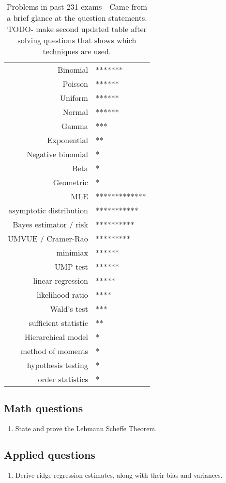 \documentclass[10pt, twocolumn]{article}
\begin{document}
\begin{table}[]
    \centering
    \caption{Problems in past 231 exams - Came from a brief glance at the
    question statements. TODO- make second updated table after solving
    questions that shows which techniques are used.}
    \label{231problems}
    \begin{tabular}{rl}

        Binomial                & ******* \\
        Poisson                 & ****** \\
        Uniform                 & ****** \\
        Normal                  & ****** \\
        Gamma                   & *** \\
        Exponential             & ** \\
        Negative binomial       & * \\
        Beta                    & * \\
        Geometric               & * \\
        MLE                     & ************* \\
        asymptotic distribution & *********** \\
        Bayes estimator / risk  & ********** \\
        UMVUE / Cramer-Rao      & ********* \\
        minimiax                & ****** \\
        UMP test                & ****** \\
        linear regression       & ***** \\
        likelihood ratio        & **** \\
        Wald's test             & *** \\
        sufficient statistic    & ** \\
        Hierarchical model      & * \\
        method of moments       & * \\
        hypothesis testing      & * \\
        order statistics        & * \\

    \end{tabular}
\end{table}

\subsection{Math questions}

\begin{enumerate}
    \item State and prove the Lehmann Scheffe Theorem.
\end{enumerate}

\subsection{Applied questions}

\begin{enumerate}
    \item Derive ridge regression estimates, along with their bias and
        variances.
\end{enumerate}
\end{document}
